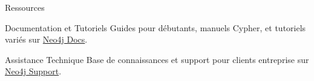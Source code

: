 \begin{frame}{Ressources}

  \begin{block}{Documentation et Tutoriels}
    Guides pour débutants, manuels Cypher, et tutoriels variés sur \href{https://neo4j.com/docs/}{Neo4j Docs}.
  \end{block}
  
    \begin{block}{Assistance Technique}
     Base de connaissances et support pour clients entreprise sur \href{https://neo4j.com/support/}{Neo4j Support}.
    \end{block}
    
\end{frame}